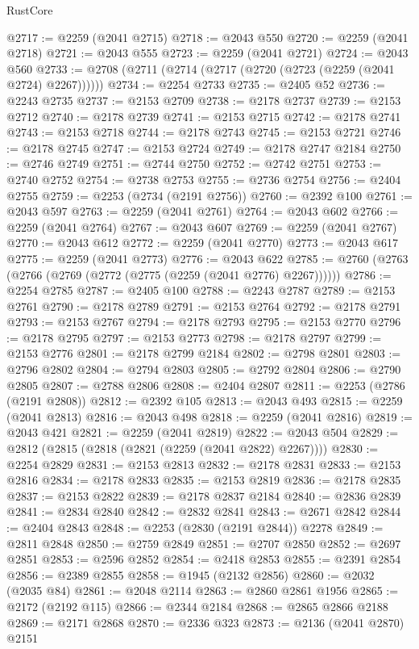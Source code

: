 \begin{lexlean}{RustCore}
\begin{coremodule}
@2717 := @2259 (@2041 @2715)
@2718 := @2043 @550
@2720 := @2259 (@2041 @2718)
@2721 := @2043 @555
@2723 := @2259 (@2041 @2721)
@2724 := @2043 @560
@2733 := @2708 (@2711 (@2714 (@2717 (@2720 (@2723 (@2259 (@2041 @2724) @2267))))))
@2734 := @2254 @2733
@2735 := @2405 @52
@2736 := @2243 @2735
@2737 := @2153 @2709
@2738 := @2178 @2737
@2739 := @2153 @2712
@2740 := @2178 @2739
@2741 := @2153 @2715
@2742 := @2178 @2741
@2743 := @2153 @2718
@2744 := @2178 @2743
@2745 := @2153 @2721
@2746 := @2178 @2745
@2747 := @2153 @2724
@2749 := @2178 @2747 @2184
@2750 := @2746 @2749
@2751 := @2744 @2750
@2752 := @2742 @2751
@2753 := @2740 @2752
@2754 := @2738 @2753
@2755 := @2736 @2754
@2756 := @2404 @2755
@2759 := @2253 (@2734 (@2191 @2756))
@2760 := @2392 @100
@2761 := @2043 @597
@2763 := @2259 (@2041 @2761)
@2764 := @2043 @602
@2766 := @2259 (@2041 @2764)
@2767 := @2043 @607
@2769 := @2259 (@2041 @2767)
@2770 := @2043 @612
@2772 := @2259 (@2041 @2770)
@2773 := @2043 @617
@2775 := @2259 (@2041 @2773)
@2776 := @2043 @622
@2785 := @2760 (@2763 (@2766 (@2769 (@2772 (@2775 (@2259 (@2041 @2776) @2267))))))
@2786 := @2254 @2785
@2787 := @2405 @100
@2788 := @2243 @2787
@2789 := @2153 @2761
@2790 := @2178 @2789
@2791 := @2153 @2764
@2792 := @2178 @2791
@2793 := @2153 @2767
@2794 := @2178 @2793
@2795 := @2153 @2770
@2796 := @2178 @2795
@2797 := @2153 @2773
@2798 := @2178 @2797
@2799 := @2153 @2776
@2801 := @2178 @2799 @2184
@2802 := @2798 @2801
@2803 := @2796 @2802
@2804 := @2794 @2803
@2805 := @2792 @2804
@2806 := @2790 @2805
@2807 := @2788 @2806
@2808 := @2404 @2807
@2811 := @2253 (@2786 (@2191 @2808))
@2812 := @2392 @105
@2813 := @2043 @493
@2815 := @2259 (@2041 @2813)
@2816 := @2043 @498
@2818 := @2259 (@2041 @2816)
@2819 := @2043 @421
@2821 := @2259 (@2041 @2819)
@2822 := @2043 @504
@2829 := @2812 (@2815 (@2818 (@2821 (@2259 (@2041 @2822) @2267))))
@2830 := @2254 @2829
@2831 := @2153 @2813
@2832 := @2178 @2831
@2833 := @2153 @2816
@2834 := @2178 @2833
@2835 := @2153 @2819
@2836 := @2178 @2835
@2837 := @2153 @2822
@2839 := @2178 @2837 @2184
@2840 := @2836 @2839
@2841 := @2834 @2840
@2842 := @2832 @2841
@2843 := @2671 @2842
@2844 := @2404 @2843
@2848 := @2253 (@2830 (@2191 @2844)) @2278
@2849 := @2811 @2848
@2850 := @2759 @2849
@2851 := @2707 @2850
@2852 := @2697 @2851
@2853 := @2596 @2852
@2854 := @2418 @2853
@2855 := @2391 @2854
@2856 := @2389 @2855
@2858 := @1945 (@2132 @2856)
@2860 := @2032 (@2035 @84)
@2861 := @2048 @2114
@2863 := @2860 @2861 @1956
@2865 := @2172 (@2192 @115)
@2866 := @2344 @2184
@2868 := @2865 @2866 @2188
@2869 := @2171 @2868
@2870 := @2336 @323
@2873 := @2136 (@2041 @2870) @2151

\end{coremodule}
\end{lexlean}
